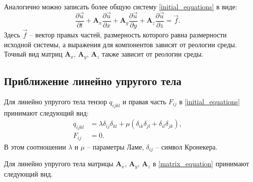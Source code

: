 Аналогично можно записать более общую систему \ref{initial_equations} в виде:
\begin{equation}
\label{matrix_equation}
\frac{\partial\vec{u}}{\partial{t}}+\mathbf{A}_x\frac{\partial\vec{u}}{\partial{x}}+
\mathbf{A}_y\frac{\partial\vec{u}}{\partial{y}}+
\mathbf{A}_z\frac{\partial\vec{u}}{\partial{z}}=\vec{f}.
\end{equation}
Здесь $\vec{f}$ -- вектор правых частей, размерность которого равна размерности исходной системы, а выражения для компонентов зависят от реологии среды. Точный вид матриц $\mathbf{A}_x$, $\mathbf{A}_y$, $\mathbf{A}_z$ также зависит от реологии среды.

\clearpage
\newpage

\subsection{Приближение линейно упругого тела}
\label{elastic_matrixes}

Для линейно упругого тела тензор $q_{ijkl}$ и правая часть $F_{ij}$ в \ref{initial_equations} принимают следующий вид:
\begin{align}
\label{tensor_qijkl_elastic}
q_{ijkl}&=\lambda\delta_{ij}\delta_{kl}+\mu(\delta_{ik}\delta_{jl}+\delta_{il}
\delta_{jk}),\nonumber\\
F_{ij}&=0.
\end{align}
В этом соотношении $\lambda$ и $\mu$ -- параметры Ламе, $\delta_{ij}$ -- символ Кронекера.

Для линейно упругого тела матрицы $\mathbf{A}_x$, $\mathbf{A}_y$, $\mathbf{A}_z$ в \ref{matrix_equation} принимают следующий вид.

